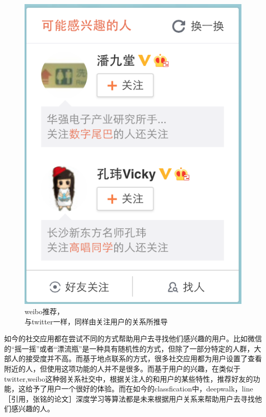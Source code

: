 \begin{figure}[h]
\begin{minipage}[t]{0.45\linewidth}
\includegraphics[width=\textwidth]{img/chap1/weibo_recommend.png}
\caption{weibo推荐，\\与twitter一样，同样由关注用户的关系所推导\label{weibo推荐，}}
\end{minipage}

\end{figure}

如今的社交应用都在尝试不同的方式帮助用户去寻找他们感兴趣的用户。比如微信的“摇一摇”或者“漂流瓶”是一种具有随机性的方式，但除了一部分特定的人群，大部人的接受度并不高。而基于地点联系的方式，很多社交应用都为用户设置了查看附近的人，但使用这项功能的人并不是很多。而基于用户的兴趣，在类似于twitter,weibo这种弱关系社交中，根据关注人的和用户的某些特性，推荐好友的功能，这给予了用户一个很好的体验。而在如今的classfication中，deepwalk，line［引用，张铭的论文］深度学习等算法都是未来根据用户关系来帮助用户去寻找他们感兴趣的人。



